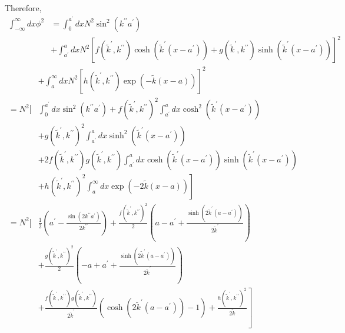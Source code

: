 \documentclass{article}
\begin{document}
Therefore,
$$
\begin{align*}
\int_{-\infty}^{\infty} d x \phi^{2} & =\int_{0}^{a^{\prime}} d x N^{2} \sin ^{2}\left(k^{\prime \prime} a^{\prime}\right)  \tag{4.7.46}\\
& +\int_{a^{\prime}}^{a} d x N^{2}\left[f\left(\tilde{k}^{\prime}, k^{\prime \prime}\right) \cosh \left(\tilde{k}^{\prime}\left(x-a^{\prime}\right)\right)+g\left(\tilde{k}^{\prime}, k^{\prime \prime}\right) \sinh \left(\tilde{k}^{\prime}\left(x-a^{\prime}\right)\right)\right]^{2}
\end{align*}
$$
$$
\begin{aligned}
& +\int_{a}^{\infty} d x N^{2}\left[h\left(\tilde{k}^{\prime}, k^{\prime \prime}\right) \exp (-\tilde{k}(x-a))\right]^{2} \\
=N^{2}[ & \int_{0}^{a^{\prime}} d x \sin ^{2}\left(k^{\prime \prime} a^{\prime}\right)+f\left(\tilde{k}^{\prime}, k^{\prime \prime}\right)^{2} \int_{a^{\prime}}^{a} d x \cosh ^{2}\left(\tilde{k}^{\prime}\left(x-a^{\prime}\right)\right) \\
& +g\left(\tilde{k}^{\prime}, k^{\prime \prime}\right)^{2} \int_{a^{\prime}}^{a} d x \sinh ^{2}\left(\tilde{k}^{\prime}\left(x-a^{\prime}\right)\right) \\
& +2 f\left(\tilde{k}^{\prime}, k^{\prime \prime}\right) g\left(\tilde{k}^{\prime}, k^{\prime \prime}\right) \int_{a^{\prime}}^{a} d x \cosh \left(\tilde{k}^{\prime}\left(x-a^{\prime}\right)\right) \sinh \left(\tilde{k}^{\prime}\left(x-a^{\prime}\right)\right) \\
& \left.+h\left(\tilde{k}^{\prime}, k^{\prime \prime}\right)^{2} \int_{a}^{\infty} d x \exp (-2 \tilde{k}(x-a))\right] \\
=N^{2}[ & \frac{1}{2}\left(a^{\prime}-\frac{\sin \left(2 k^{\prime \prime} a^{\prime}\right)}{2 k^{\prime \prime}}\right)+\frac{f\left(\tilde{k}^{\prime}, k^{\prime \prime}\right)^{2}}{2}\left(a-a^{\prime}+\frac{\sinh \left(2 \tilde{k}^{\prime}\left(a-a^{\prime}\right)\right)}{2 \tilde{k}^{\prime}}\right) \\
& +\frac{g\left(\tilde{k}^{\prime}, k^{\prime \prime}\right)^{2}}{2}\left(-a+a^{\prime}+\frac{\sinh \left(2 \tilde{k}^{\prime}\left(a-a^{\prime}\right)\right)}{2 \tilde{k}^{\prime}}\right) \\
& \left.+\frac{f\left(\tilde{k}^{\prime}, k^{\prime \prime}\right) g\left(\tilde{k}^{\prime}, k^{\prime \prime}\right)}{2 \tilde{k}^{\prime}}\left(\cosh \left(2 \tilde{k}^{\prime}\left(a-a^{\prime}\right)\right)-1\right)+\frac{h\left(\tilde{k}^{\prime}, k^{\prime \prime}\right)^{2}}{2 \tilde{k}}\right] \\

\end{aligned}$$
\end{document}

